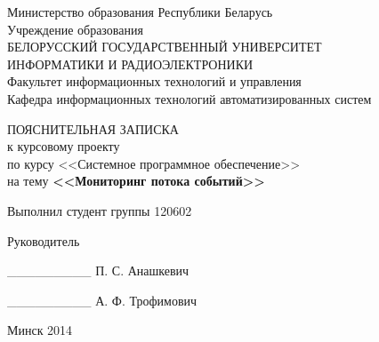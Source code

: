 \begin{titlepage}
\thispagestyle{empty}
\setlength{\parindent}{0ex} %

\begin{center}
  Министерство образования Республики Беларусь \\
  \smallskip
  Учреждение образования \\
  БЕЛОРУССКИЙ ГОСУДАРСТВЕННЫЙ УНИВЕРСИТЕТ \\
  ИНФОРМАТИКИ И РАДИОЭЛЕКТРОНИКИ \\
  \smallskip
  Факультет информационных технологий и управления \\
  \smallskip
  Кафедра информационных технологий автоматизированных систем
\end{center}

\vspace{50mm}

\begin{center}
  ПОЯСНИТЕЛЬНАЯ ЗАПИСКА \\
  к курсовому проекту \\
  по курсу <<Системное программное обеспечение>> \\
  на тему \textbf{<<Мониторинг потока событий>>} \\
\end{center}

\vspace{49mm}

\begin{minipage}{.55\linewidth}
    Выполнил студент группы 120602

    \smallskip

    Руководитель
\end{minipage}
\hfill
\begin{minipage}{.4\linewidth}
  \begin{flushright}
    \_\_\_\_\_\_\_\_\_ \hspace{1.7mm} П. С. Анашкевич

    \smallskip

    \_\_\_\_\_\_\_\_\_ А. Ф. Трофимович
  \end{flushright}
\end{minipage}

\vspace{50mm}
\begin{center}
  Минск 2014
\end{center}

\setlength{\parindent}{5ex} %
\end{titlepage}
